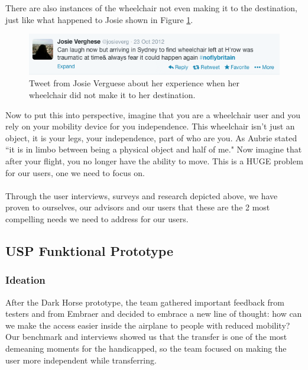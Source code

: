 There are also instances of the wheelchair not even making it to the destination, just like what happened to Josie shown in Figure \ref{fig:leftwheelchair.png}. 

\begin{figure}[h]
  \centering
     \includegraphics[width=12cm]{images/leftwheelchair.png}
   \caption{Tweet from Josie Verguese about her experience when her wheelchair did not make it to her destination.}
  \label{fig:leftwheelchair.png}
\end{figure}

Now to put this into perspective, imagine that you are a wheelchair user and you rely on your mobility device for you independence. This wheelchair isn't just an object, it is your legs, your independence, part of who are you. As Aubrie stated ``it is in limbo between being a physical object and half of me." Now imagine that after your flight, you no longer have the ability to move. This is a HUGE problem for our users, one we need to focus on. \\
\\

 Through  the user interviews, surveys and research depicted above, we have proven to ourselves, our advisors and our users that these are the 2 most compelling needs we need to address for our users. 

\subsection{USP Funktional Prototype}
\subsubsection{Ideation}
After the Dark Horse prototype, the team gathered important feedback from testers and from Embraer and decided to embrace a new line of thought: how can we make the access easier inside the airplane to people with reduced mobility? \\

Our benchmark and interviews showed us that the transfer is one of the most demeaning moments for the handicapped, so the team focused on making the user more independent while transferring. \\

